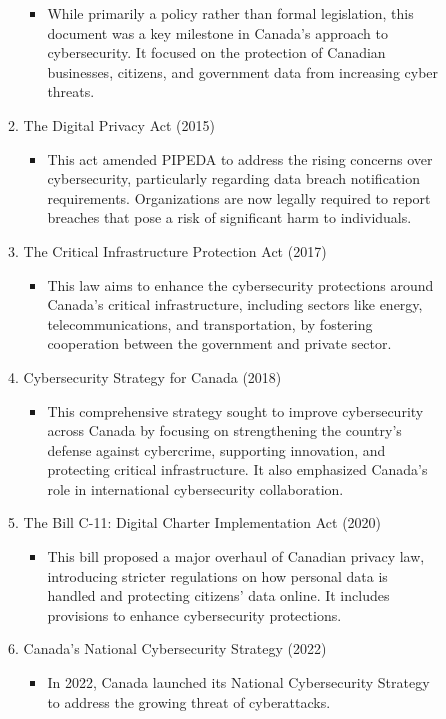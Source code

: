 \begin{enumerate}
\begin{description}
\begin{enumerate}[label=\arabic*.]
\begin{itemize}
				\item While primarily a policy rather than formal legislation, this document was a key milestone in Canada’s approach to cybersecurity.
					It focused on the protection of Canadian businesses, citizens, and government data from increasing cyber threats.
			\end{itemize}
			\item The Digital Privacy Act (2015)
			\begin{itemize}
				\item This act amended PIPEDA to address the rising concerns over cybersecurity, particularly regarding data breach notification requirements.
					Organizations are now legally required to report breaches that pose a risk of significant harm to individuals.
			\end{itemize}
			\item The Critical Infrastructure Protection Act (2017)
			\begin{itemize}
				\item This law aims to enhance the cybersecurity protections around Canada’s critical infrastructure, including sectors like energy, telecommunications, and transportation, by fostering cooperation between the government and private sector.
			\end{itemize}
			\item Cybersecurity Strategy for Canada (2018)
			\begin{itemize}
				\item This comprehensive strategy sought to improve cybersecurity across Canada by focusing on strengthening the country’s defense against cybercrime, supporting innovation, and protecting critical infrastructure.
					It also emphasized Canada’s role in international cybersecurity collaboration.
			\end{itemize}
			\item The Bill C-11: Digital Charter Implementation Act (2020)
			\begin{itemize}
				\item This bill proposed a major overhaul of Canadian privacy law, introducing stricter regulations on how personal data is handled and protecting citizens’ data online.
					It includes provisions to enhance cybersecurity protections.
			\end{itemize}
			\item Canada’s National Cybersecurity Strategy (2022)
			\begin{itemize}
				\item In 2022, Canada launched its National Cybersecurity Strategy to address the growing threat of cyberattacks.

\end{itemize}
\end{enumerate}
\end{description}
\end{enumerate}
